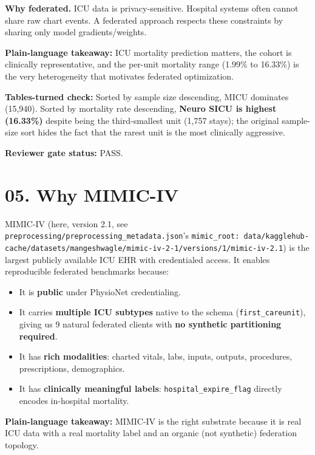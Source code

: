 \documentclass{article}
\begin{document}
\textbf{Why federated.} ICU data is privacy-sensitive. Hospital systems often cannot share raw chart events. A federated approach respects these constraints by sharing only model gradients/weights.


\textbf{Plain-language takeaway:} ICU mortality prediction matters, the cohort is clinically representative, and the per-unit mortality range (1.99\% to 16.33\%) is the very heterogeneity that motivates federated optimization.


\textbf{Tables-turned check:} Sorted by sample size descending, MICU dominates (15,940). Sorted by mortality rate descending, \textbf{Neuro SICU is highest (16.33\%)} despite being the third-smallest unit (1,757 stays); the original sample-size sort hides the fact that the rarest unit is the most clinically aggressive.


\textbf{Reviewer gate status:} PASS.



\clearpage
\section{05. Why MIMIC-IV}


MIMIC-IV (here, version 2.1, see \texttt{preprocessing/preprocessing\_metadata.json}'s \texttt{mimic\_root: data/kagglehub-cache/datasets/mangeshwagle/mimic-iv-2-1/versions/1/mimic-iv-2.1}) is the largest publicly available ICU EHR with credentialed access. It enables reproducible federated benchmarks because:


\begin{itemize}[leftmargin=1.4em,itemsep=2pt,topsep=2pt]
  \item It is \textbf{public} under PhysioNet credentialing.
  \item It carries \textbf{multiple ICU subtypes} native to the schema (\texttt{first\_careunit}), giving us 9 natural federated clients with \textbf{no synthetic partitioning required}.
  \item It has \textbf{rich modalities}: charted vitals, labs, inputs, outputs, procedures, prescriptions, demographics.
  \item It has \textbf{clinically meaningful labels}: \texttt{hospital\_expire\_flag} directly encodes in-hospital mortality.
\end{itemize}


\textbf{Plain-language takeaway:} MIMIC-IV is the right substrate because it is real ICU data with a real mortality label and an organic (not synthetic) federation topology.
\end{document}
